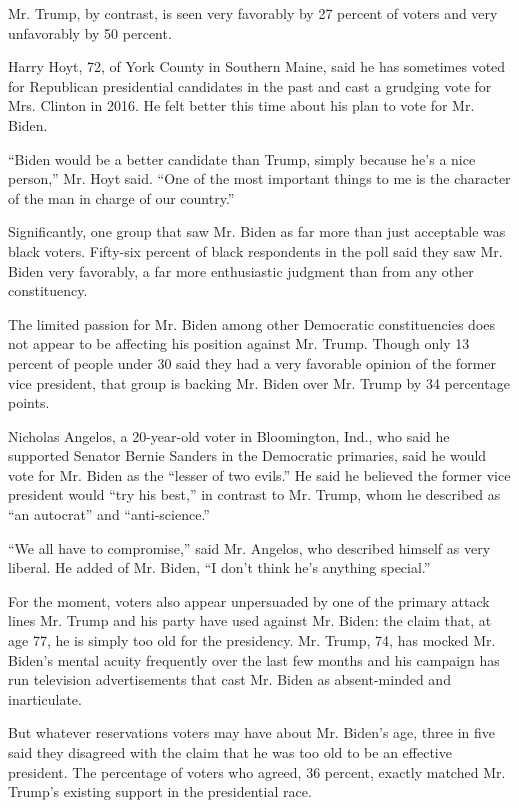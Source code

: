 Mr. Trump, by contrast, is seen very favorably by 27 percent of voters
and very unfavorably by 50 percent.

Harry Hoyt, 72, of York County in Southern Maine, said he has sometimes
voted for Republican presidential candidates in the past and cast a
grudging vote for Mrs. Clinton in 2016. He felt better this time about
his plan to vote for Mr. Biden.

``Biden would be a better candidate than Trump, simply because he's a
nice person,'' Mr. Hoyt said. ``One of the most important things to me
is the character of the man in charge of our country.''

Significantly, one group that saw Mr. Biden as far more than just
acceptable was black voters. Fifty-six percent of black respondents in
the poll said they saw Mr. Biden very favorably, a far more enthusiastic
judgment than from any other constituency.

The limited passion for Mr. Biden among other Democratic constituencies
does not appear to be affecting his position against Mr. Trump. Though
only 13 percent of people under 30 said they had a very favorable
opinion of the former vice president, that group is backing Mr. Biden
over Mr. Trump by 34 percentage points.

Nicholas Angelos, a 20-year-old voter in Bloomington, Ind., who said he
supported Senator Bernie Sanders in the Democratic primaries, said he
would vote for Mr. Biden as the ``lesser of two evils.'' He said he
believed the former vice president would ``try his best,'' in contrast
to Mr. Trump, whom he described as ``an autocrat'' and ``anti-science.''

``We all have to compromise,'' said Mr. Angelos, who described himself
as very liberal. He added of Mr. Biden, ``I don't think he's anything
special.''

For the moment, voters also appear unpersuaded by one of the primary
attack lines Mr. Trump and his party have used against Mr. Biden: the
claim that, at age 77, he is simply too old for the presidency. Mr.
Trump, 74, has mocked Mr. Biden's mental acuity frequently over the last
few months and his campaign has run television advertisements that cast
Mr. Biden as absent-minded and inarticulate.

But whatever reservations voters may have about Mr. Biden's age, three
in five said they disagreed with the claim that he was too old to be an
effective president. The percentage of voters who agreed, 36 percent,
exactly matched Mr. Trump's existing support in the presidential race.

